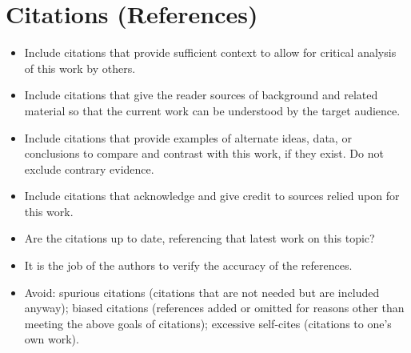 \section*{Citations (References)}
\begin{itemize}
  \item Include citations that provide sufficient context to allow for critical analysis of this work by others.
  \item Include citations that give the reader sources of background and related material so that the current work can be understood by the target audience.
  \item Include citations that provide examples of alternate ideas, data, or conclusions to compare and contrast with this work, if they exist. Do not exclude contrary evidence.
  \item Include citations that acknowledge and give credit to sources relied upon for this work.
  \item Are the citations up to date, referencing that latest work on this topic?
  \item It is the job of the authors to verify the accuracy of the references.
  \item Avoid: spurious citations (citations that are not needed but are included anyway); biased citations (references added or omitted for reasons other than meeting the above goals of citations); excessive self-cites (citations to one's own work).
\end{itemize}

